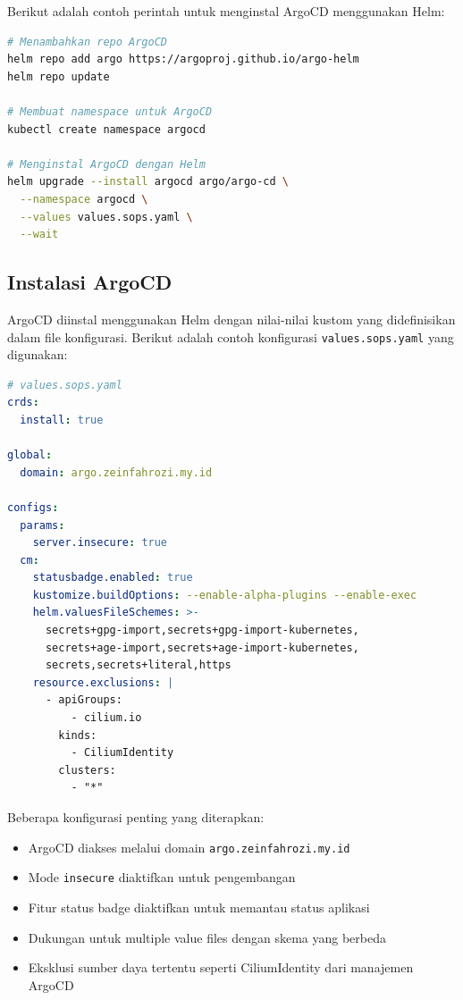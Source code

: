 Berikut adalah contoh perintah untuk menginstal ArgoCD menggunakan Helm:

\begin{lstlisting}[language=bash, basicstyle=\footnotesize\ttfamily]
# Menambahkan repo ArgoCD
helm repo add argo https://argoproj.github.io/argo-helm
helm repo update

# Membuat namespace untuk ArgoCD
kubectl create namespace argocd

# Menginstal ArgoCD dengan Helm
helm upgrade --install argocd argo/argo-cd \
  --namespace argocd \
  --values values.sops.yaml \
  --wait
\end{lstlisting}

\subsection{Instalasi ArgoCD}
ArgoCD diinstal menggunakan Helm dengan nilai-nilai kustom yang didefinisikan dalam file konfigurasi. Berikut adalah contoh konfigurasi \texttt{values.sops.yaml} yang digunakan:

\begin{lstlisting}[language=yaml, basicstyle=\footnotesize\ttfamily]
# values.sops.yaml
crds:
  install: true

global:
  domain: argo.zeinfahrozi.my.id

configs:
  params:
    server.insecure: true
  cm:
    statusbadge.enabled: true
    kustomize.buildOptions: --enable-alpha-plugins --enable-exec
    helm.valuesFileSchemes: >-
      secrets+gpg-import,secrets+gpg-import-kubernetes,
      secrets+age-import,secrets+age-import-kubernetes,
      secrets,secrets+literal,https
    resource.exclusions: |
      - apiGroups:
          - cilium.io
        kinds:
          - CiliumIdentity
        clusters:
          - "*"
\end{lstlisting}

Beberapa konfigurasi penting yang diterapkan:

\begin{itemize}
    \item ArgoCD diakses melalui domain \texttt{argo.zeinfahrozi.my.id}
    \item Mode \texttt{insecure} diaktifkan untuk pengembangan
    \item Fitur status badge diaktifkan untuk memantau status aplikasi
    \item Dukungan untuk multiple value files dengan skema yang berbeda
    \item Eksklusi sumber daya tertentu seperti CiliumIdentity dari manajemen ArgoCD
\end{itemize}

